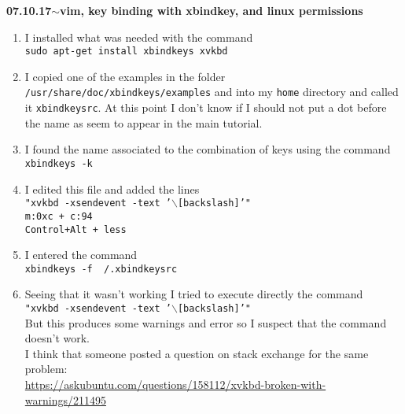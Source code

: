 \documentclass[11pt,a4paper]{article}
\newenvironment{loggentry}[2]%
{\noindent\textbf{#1}\hspace{1cm}$\mathbf{\sim}$\text{ }\textbf{#2}\\}{\vspace{0.5cm}}
\begin{document}
\begin{loggentry}{07.10.17}{vim, key binding with xbindkey, and linux permissions}
\begin{enumerate}[1)]
\item I installed what was needed with the command\\
\texttt{sudo apt-get install xbindkeys xvkbd}
\item I copied one of the examples in the folder \texttt{/usr/share/doc/xbindkeys/examples} and into my \texttt{home} directory and called it \texttt{xbindkeysrc}. At this point I don't know if I should not put a dot before the name as seem to appear in the main tutorial.
\item I found the name associated to the combination of keys using the command\\
\texttt{xbindkeys -k}
\item I edited this file and added the lines\\
\texttt{"xvkbd -xsendevent -text '$\backslash$[backslash]'"}\\
\texttt{m:0xc + c:94}\\
\texttt{Control+Alt + less}
\item I entered the command \\
\texttt{xbindkeys -f ~/.xbindkeysrc}
\item Seeing that it wasn't working I tried to execute directly the command \\
\texttt{"xvkbd -xsendevent -text '$\backslash$[backslash]'"}\\
But this produces some warnings and error so I suspect that the command doesn't work.\\
I think that someone posted a question on stack exchange for the same problem:\\
\url{https://askubuntu.com/questions/158112/xvkbd-broken-with-warnings/211495}
\end{enumerate}
\end{loggentry}
\end{document}
